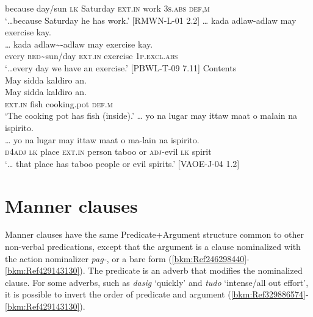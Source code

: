  {}  because  day/sun  \textsc{lk}  Saturday  \textsc{ext.in}  work  3\textsc{s.abs}  \textsc{def,m} \\
\glt ‘…because Saturday he has work.’ [RMWN-L-01 2.2]
\z
\ea
\label{ex:actions-2}
… kada  adlaw-adlaw  may  exercise  kay. \\\smallskip
\gll … kada  adlaw\sim{}-adlaw  may  exercise  kay. \\
  {}  every  \textsc{red}\sim{}sun/day  \textsc{ext.in}  exercise  1\textsc{p.excl.abs} \\
\glt ‘…every day we have an exercise.’ [PBWL-T-09 7.11]
\z
\ea
\label{ex:contents-1}
Contents \\
May  sidda  kaldiro  an. \\\smallskip \gll May  sidda  kaldiro  an. \\
\textsc{ext.in}  fish  cooking.pot  \textsc{def.m} \\
\glt ‘The cooking pot has fish (inside).’
\z
\ea
\label{ex:contents-2}
… yo  na  lugar  may  ittaw  maat  o  malain  na  ispirito. \\\smallskip \gll … yo  na  lugar  may  ittaw  maat  o  ma-lain  na  ispirito. \\
 {}  \textsc{d4adj}  \textsc{lk}  place  \textsc{ext.in}  person  taboo  or  \textsc{adj}-evil  \textsc{lk}  spirit \\
\glt ‘… that place has taboo people or evil spirits.’ [VAOE-J-04 1.2]
 
\z

\section{Manner clauses}
\label{bkm:Ref444446090}\label{sec:mannerclauses} 

Manner clauses have the same Predicate+Argument structure common to other non-verbal predications, except that the argument is a clause nominalized with the action nominalizer \textit{pag-}, or a bare form (\ref{bkm:Ref246298440}-\ref{bkm:Ref429143130}). The predicate is an adverb that modifies the nominalized clause. For some adverbs, such as \textit{dasig} ‘quickly’ and \textit{tudo} `intense/all out effort', it is possible to invert the order of predicate and argument (\ref{bkm:Ref329886574}-\ref{bkm:Ref429143130}).

